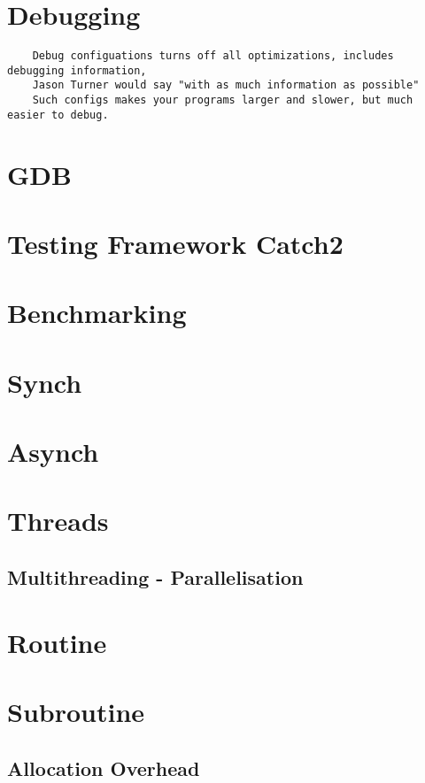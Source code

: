 \section{Debugging}

\begin{verbatim}
    Debug configuations turns off all optimizations, includes debugging information,
    Jason Turner would say "with as much information as possible"
    Such configs makes your programs larger and slower, but much easier to debug. 
\end{verbatim}

\section{GDB}
\section{Testing Framework Catch2}

\section{Benchmarking}

\section{Synch}
\section{Asynch}
\section{Threads}
\subsection{Multithreading - Parallelisation}

\section{Routine}
\section{Subroutine}


\subsection{Allocation Overhead}
